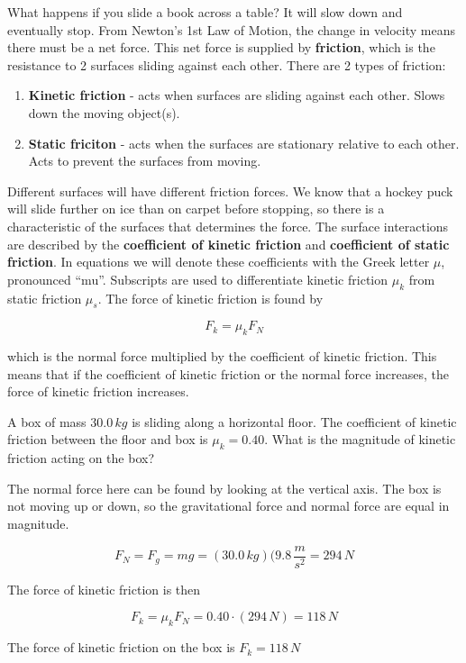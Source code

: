 \documentclass[12pt]{book}
\begin{document}
What happens if you slide a book across a table? It will slow down and eventually stop. From Newton's 1st Law of Motion, the change in velocity means there must be a net force. This net force is supplied by \textbf{friction}, which is the resistance to 2 surfaces sliding against each other. There are 2 types of friction:

\begin{enumerate}
\item \textbf{Kinetic friction} - acts when surfaces are sliding against each other. Slows down the moving object(s).

\item \textbf{Static friciton} - acts when the surfaces are stationary relative to each other. Acts to prevent the surfaces from moving.
\end{enumerate}

Different surfaces will have different friction forces. We know that a hockey puck will slide further on ice than on carpet before stopping, so there is a characteristic of the surfaces that determines the force. The surface interactions are described by the \textbf{coefficient of kinetic friction} and \textbf{coefficient of static friction}. In equations we will denote these coefficients with the Greek letter $\mu$, pronounced ``mu''. Subscripts are used to differentiate kinetic friction $\mu_k$ from static friction $\mu_s$. The force of kinetic friction is found by

\begin{equation}
F_k = \mu_k F_N
\label{kfriction}
\end{equation}

which is the normal force multiplied by the coefficient of kinetic friction. This means that if the coefficient of kinetic friction or the normal force increases, the force of kinetic friction increases.

\begin{exampleblock}

A box of mass $30.0 \, kg$ is sliding along a horizontal floor. The coefficient of kinetic friction between the floor and box is $\mu_k = 0.40$. What is the magnitude of kinetic friction acting on the box?

\hspace{10pt}

The normal force here can be found by looking at the vertical axis. The box is not moving up or down, so the gravitational force and normal force are equal in magnitude.

\begin{equation}
F_N = F_g = mg = (30.0 \, kg)(9.8 \, \frac{m}{s^2} = 294 \, N
\end{equation}

The force of kinetic friction is then

\begin{equation}
F_k = \mu_k F_N = 0.40 \cdot (294 \, N) = 118 \, N
\end{equation}

The force of kinetic friction on the box is $F_k = 118 \, N$

\end{exampleblock}
\end{document}
